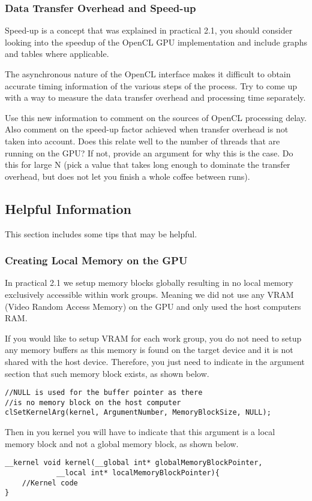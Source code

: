 \subsubsection{Data Transfer Overhead and Speed-up}
Speed-up is a concept that was explained in practical 2.1, you should consider looking into the speedup of the OpenCL GPU implementation and include graphs and tables where applicable.

The asynchronous nature of the OpenCL interface makes it difficult to obtain accurate timing information of the various steps of the process. Try to come up with a way to measure the data transfer overhead and processing time separately.

Use this new information to comment on the sources of OpenCL processing delay. Also comment on the speed-up factor achieved when transfer overhead is not taken into account. Does this relate well to the number of threads that are running on the GPU? If not, provide an argument for why this is the case. Do this for large N (pick a value that takes long enough to dominate the transfer overhead, but does not let you finish a whole coffee between runs).

\newpage
\subsection{Helpful Information}
This section includes some tips that may be helpful.

\subsubsection{Creating Local Memory on the GPU}
In practical 2.1 we setup memory blocks globally resulting in no local memory exclusively accessible within work groups. Meaning we did not use any VRAM (Video Random Access Memory) on the GPU and only used the host computers RAM. 

If you would like to setup VRAM for each work group, you do not need to setup any memory buffers as this memory is found on the target device and it is not shared with the host device. Therefore, you just need to indicate in the argument section that such memory block exists, as shown below.
\begin{lstlisting}
//NULL is used for the buffer pointer as there 
//is no memory block on the host computer
clSetKernelArg(kernel, ArgumentNumber, MemoryBlockSize, NULL); 
\end{lstlisting}

Then in you kernel you will have to indicate that this argument is a local memory block and not a global memory block, as shown below.
\begin{lstlisting}
__kernel void kernel(__global int* globalMemoryBlockPointer,
            __local int* localMemoryBlockPointer){
	//Kernel code
}
\end{lstlisting}

